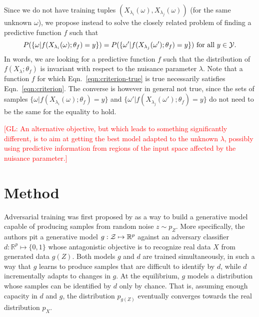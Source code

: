 \documentclass{article}
\newcommand{\glnote}[1]{\textcolor{red}{[GL: #1]}}
\theoremstyle{plain}
\begin{document}
Since we do not have training tuples $(X_{\lambda_i}(\omega),
X_{\lambda_j}(\omega))$ (for the same unknown $\omega$), we propose instead to
solve the closely related problem of finding a predictive function $f$ such that
\begin{equation}\label{eqn:criterion}
    P(\{ \omega | f(X_{\lambda_i}(\omega) ; \theta_f) = y \} ) = P( \{ \omega' | f(X_{\lambda_j}(\omega') ; \theta_f) = y\}) \text{ for all $y \in {\cal Y}$}.
\end{equation}
In words, we are looking for a predictive function $f$ such that  the
distribution of $f(X_\lambda; \theta_f)$ is invariant with respect to the nuisance
parameter $\lambda$. Note that a function $f$ for which Eqn.~\ref{eqn:criterion-true} is
true necessarily satisfies Eqn.~\ref{eqn:criterion}. The converse is however in
general not true, since the sets of samples $\{ \omega | f(X_{\lambda_i}(\omega); \theta_f) = y \}$
and $\{ \omega' | f(X_{\lambda_j}(\omega'); \theta_f) = y \}$ do not need to be the same
for the equality to hold.

\glnote{An alternative objective, but which leads to something
significantly different, is to aim at getting the best model adapted
to the unknown $\lambda$, possibly using predictive information from
regions of the input space affected by the nuisance parameter.}


\section{Method}
\label{sec:method}

Adversarial training was first proposed by \cite{goodfellow2014generative} as a
way to build a generative model capable of producing samples from random noise
$z \sim p_Z$. More specifically, the authors pit a generative model $g: {\cal Z}
\mapsto \mathbb{R}^p$ against an adversary classifier $d : \mathbb{R}^p \mapsto \{
0, 1\}$ whose antagonistic objective is to recognize real data $X$ from generated data $g(Z)$. Both
models $g$ and $d$ are trained simultaneously, in such a way that $g$ learns to
produce samples that are difficult to identify by $d$, while $d$ incrementally
adapts to changes in $g$. At the equilibrium, $g$ models a distribution whose
samples can be identified by $d$ only by chance. That is, assuming enough
capacity in $d$ and  $g$, the distribution $p_{g(Z)}$ eventually converges
towards the real distribution $p_X$.
\end{document}
